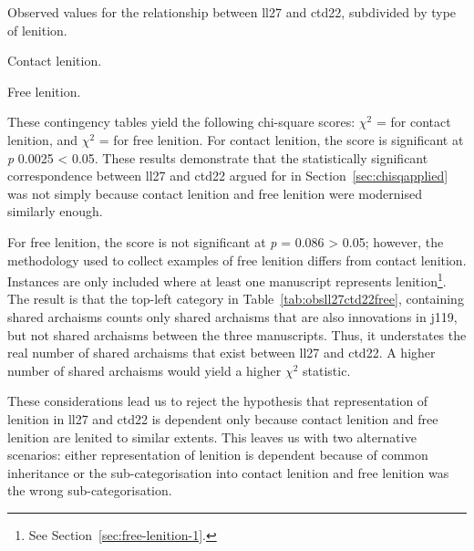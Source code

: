 \begin{table}[h]
  \caption{Observed values for the relationship between  \acrshort{ll27} and \acrshort{ctd22}, subdivided by type of lenition.}
  \label{tab:obsll27ctd22freecontact}
  \begin{subtable}[b]{0.5\linewidth}
    \centering
    \caption{Contact lenition.}
    \label{tab:contactlentab}
    
  \end{subtable}%
  \begin{subtable}[b]{0.5\linewidth}
    \centering
    \caption{Free lenition.}
    \label{tab:obsll27ctd22free}
    
  \end{subtable}
\end{table}

 These contingency tables yield the following chi-square scores: \(\chi^2\) =  for contact lenition, and \(\chi^2\) =  for free lenition. For contact lenition, the score is significant at \emph{p} 0.0025 < 0.05. These results  demonstrate that the statistically significant correspondence between \gls{ll27} and \gls{ctd22} argued for in Section~\ref{sec:chisqapplied} was not simply because contact lenition and free lenition were modernised similarly enough. 

For free lenition, the score is not significant at \emph{p} = 0.086 > 0.05; however, the methodology used to collect examples of free lenition differs from contact lenition. Instances are only included where at least one manuscript represents lenition\footnote{See Section~\ref{sec:free-lenition-1}.}. The result is that the top-left category in Table~\ref{tab:obsll27ctd22free}, containing shared archaisms counts only shared archaisms that are also innovations in \gls{j119}, but not shared archaisms between the three manuscripts. Thus, it understates the real number of shared archaisms that exist between \gls{ll27} and \gls{ctd22}. A higher number of shared archaisms would yield a higher \(\chi^2\) statistic.

These considerations lead us to reject the hypothesis that representation of lenition in \gls{ll27} and \gls{ctd22} is dependent only because contact lenition and free lenition are lenited to similar extents. This leaves us with two alternative scenarios: either representation of lenition is dependent because of common inheritance or the sub-categorisation into contact lenition and free lenition was the wrong sub-categorisation.

